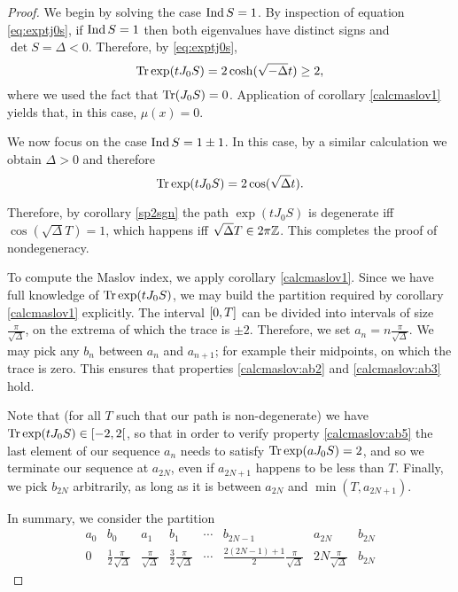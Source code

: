 \begin{proof}
We begin by solving the case $\operatorname{Ind} S = 1$. By inspection of equation \eqref{eq:exptj0s}, if $\operatorname{Ind} S = 1$ then both eigenvalues have distinct signs and $\det S = \Delta < 0$. Therefore, by \eqref{eq:exptj0s},
\begin{equation}
\operatorname{Tr} \exp(t J_0 S) = 2 \cosh(\sqrt{-\Delta} t) \geq 2,
\end{equation}
where we used the fact that $\operatorname{Tr}(J_0 S) = 0$. Application of corollary \ref{calcmaslov1} yields that, in this case, $\mu(x) = 0$.

We now focus on the case $\operatorname{Ind} S = 1 \pm 1$. In this case, by a similar calculation we obtain $\Delta > 0$ and therefore
\begin{equation}
\operatorname{Tr} \exp(t J_0 S) = 2 \cos(\sqrt\Delta t).
\end{equation}

Therefore, by corollary \ref{sp2sgn} the path $\exp(t J_0 S)$ is degenerate iff $\cos(\sqrt \Delta T) = 1$, which happens iff $\sqrt\Delta T \in 2 \pi \mathbb{Z}$. This completes the proof of nondegeneracy.

\smallskip

To compute the Maslov index, we apply corollary \ref{calcmaslov1}. Since we have full knowledge of $\operatorname{Tr} \exp(t J_0 S)$, we may build the partition required by corollary \ref{calcmaslov1} explicitly. The interval $\interval 0 T$ can be divided into intervals of size $\frac\pi{\sqrt\Delta}$, on the extrema of which the trace is $\pm 2$. Therefore, we set $a_n = n \frac\pi{\sqrt\Delta}$. We may pick any $b_n$ between $a_n$ and $a_{n+1}$; for example their midpoints, on which the trace is zero. This ensures that properties \ref{calcmaslov:ab2} and \ref{calcmaslov:ab3} hold.

Note that (for all $T$ such that our path is non-degenerate) we have $\trace \exp(t J_0 S) \in \rinterval{-2}2$, so that in order to verify property \ref{calcmaslov:ab5} the last element of our sequence $a_n$ needs to satisfy $\operatorname{Tr} \exp(a J_0 S) = 2$, and so we terminate our sequence at $a_{2N}$, even if $a_{2N+1}$ happens to be less than $T$. Finally, we pick $b_{2N}$ arbitrarily, as long as it is between $a_{2N}$ and $\min(T, a_{2N+1})$.

In summary, we consider the partition
\begin{equation}\label{autmaslov:thepartition}
\begin{array}{c|c|c|c|c|c|c|c}
a_0 & b_0 & a_1 & b_1
& \cdots &
b_{2N-1} & a_{2N} & b_{2N} \\
\hline
0 & \frac12 \frac{\pi}{\sqrt\Delta} & \frac{\pi}{\sqrt\Delta} & \frac32 \frac{\pi}{\sqrt\Delta}
& \cdots &
\frac{2(2N-1)+1}2 \frac{\pi}{\sqrt\Delta} & 2N \frac{\pi}{\sqrt\Delta} & b_{2N}
\end{array}
\end{equation}


\end{proof}
